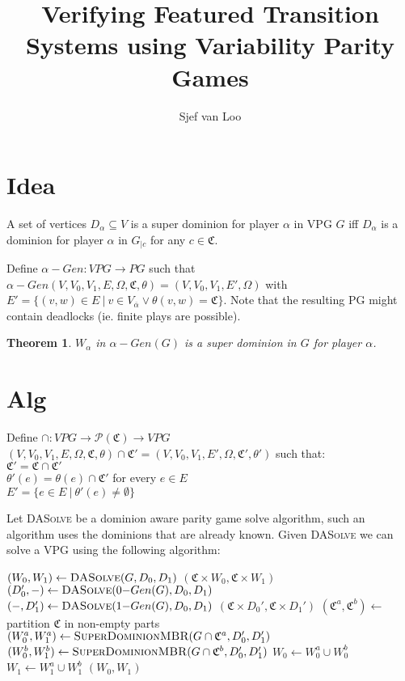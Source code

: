 \documentclass[]{article}
\title{Verifying Featured Transition Systems using Variability Parity Games}
\author{Sjef van Loo}
\newtheorem{theorem}{Theorem}[section]
\begin{document}
	\section{Idea}
A set of vertices $D_\alpha \subseteq V$ is a super dominion for player $\alpha$ in VPG $G$ iff $D_\alpha$ is a dominion for player $\alpha$ in $G_{|c}$ for any $c \in \mathfrak{C}$.

Define $\alpha{-}Gen : \textit{VPG} \rightarrow \textit{PG}$ such that $\alpha{-}Gen(V,V_0,V_1,E,\Omega,\mathfrak{C},\theta) = (V, V_0, V_1, E', \Omega)$ with $E' =\{(v,w) \in E\ |\ v \in V_{\overline{\alpha}} \vee \theta(v,w) = \mathfrak{C}\}$. Note that the resulting PG might contain deadlocks (ie. finite plays are possible).

\begin{theorem}$W_\alpha$ in $\alpha{-}Gen(G)$ is a super dominion in $G$ for player $\alpha$.\end{theorem}

	\section{Alg}
Define $\cap : \textit{VPG} \rightarrow \mathcal{P}(\mathfrak{C}) \rightarrow \textit{VPG}$\\
$(V,V_0,V_1,E,\Omega,\mathfrak{C},\theta) \cap \mathfrak{C}' = (V,V_0,V_1,E',\Omega,\mathfrak{C}', \theta')$ such that:\\
$\mathfrak{C}' = \mathfrak{C} \cap \mathfrak{C}'$\\
$\theta'(e) = \theta(e) \cap \mathfrak{C}'$ for every $e \in E$\\
$E' = \{e \in E\ |\ \theta'(e) \neq \emptyset \}$

Let \textsc{DASolve} be a dominion aware parity game solve algorithm, such an algorithm uses the dominions that are already known. Given \textsc{DASolve} we can solve a VPG using the following algorithm:
\begin{algorithm}
	\caption{$\textsc{SuperDominionMBR}(G, D_0, D_1)$}
	\begin{algorithmic}[1]
			\State $(W_0,W_1) \gets \textsc{DASolve}(G,D_0,D_1)$
			\State \Return $(\mathfrak{C} \times W_0, \mathfrak{C} \times W_1)$
		\EndIf
		\State $(D_0', -) \gets \textsc{DASolve}(0{-}Gen(G),D_0,D_1)$
		\State $(-, D_1') \gets \textsc{DASolve}(1{-}Gen(G),D_0,D_1)$
		\State \Return $(\mathfrak{C} \times D_0', \mathfrak{C} \times D_1')$
		\EndIf
		\State $(\mathfrak{C}^a,\mathfrak{C}^b) \gets$ partition $\mathfrak{C}$ in non-empty parts
		\State $(W_0^a, W_1^a) \gets \textsc{SuperDominionMBR}(G \cap \mathfrak{C}^a,D_0',D_1')$
		\State $(W_0^b, W_1^b) \gets \textsc{SuperDominionMBR}(G \cap \mathfrak{C}^b,D_0',D_1')$
		\State $W_0 \gets W_0^a \cup W_0^b$
		\State $W_1 \gets W_1^a \cup W_1^b$
		\State \Return $(W_0,W_1)$
	\end{algorithmic}
\end{algorithm}
\end{document}
